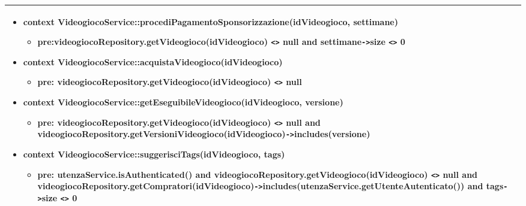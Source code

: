 \begin{tabular}{|| l | p{28em} ||}
\begin{itemize}[leftmargin=*]
		\item \textbf{context} VideogiocoService::\newline procediPagamentoSponsorizzazione(idVideogioco, settimane)
		\begin{itemize}
			\item[ ] \textbf{pre:}videogiocoRepository.getVideogioco(idVideogioco) \verb|<>| null and settimane\verb|->|size \verb|<>| 0 
		\end{itemize}

		\item \textbf{context} VideogiocoService::acquistaVideogioco(idVideogioco)
		\begin{itemize}
			\item[ ] \textbf{pre:} videogiocoRepository.getVideogioco(idVideogioco) \verb|<>| null
		\end{itemize}

		\item \textbf{context} VideogiocoService::\newline getEseguibileVideogioco(idVideogioco, versione)
		\begin{itemize}
			\item[ ] \textbf{pre:} videogiocoRepository.getVideogioco(idVideogioco) \verb|<>| null and videogiocoRepository\newline .getVersioniVideogioco(idVideogioco)\verb|->|includes(versione)
		\end{itemize}

		\item \textbf{context} VideogiocoService::suggerisciTags(idVideogioco, tags)
		\begin{itemize}
			\item[ ] \textbf{pre:} utenzaService.isAuthenticated() and videogiocoRepository.getVideogioco(idVideogioco) \verb|<>| null and videogiocoRepository\newline .getCompratori(idVideogioco)\verb|->|includes(\newline utenzaService.getUtenteAutenticato()) and tags\verb|->|size \verb|<>| 0
		\end{itemize}
	\end{itemize}\\
	\hline
\end{tabular}

\newpage
